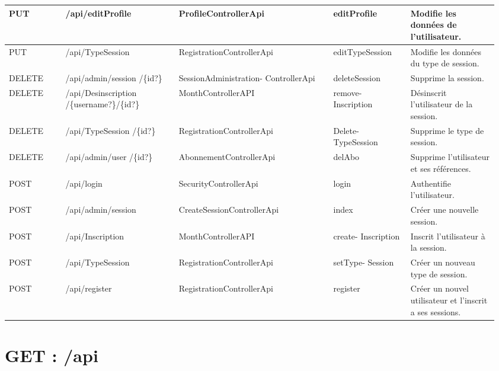 		\newpage
			\begin{center}
				\begin{tabularx}{1.11\textwidth}{| T{0.11\linewidth} | S{0.22\linewidth} | S{0.3\linewidth} | S{0.151\linewidth} | S{0.175\linewidth} |}
					\hline
						PUT & /api/editProfile & ProfileControllerApi & editProfile & Modifie les données de l'utilisateur. \\
					\hline
						PUT & /api/TypeSession & RegistrationControllerApi & editTypeSession & Modifie les données du type de session. \\
					\hline
					
					\hline
					
					\hline
						DELETE & /api/admin/session /\{id?\} & SessionAdministration- ControllerApi & deleteSession & Supprime la session. \\
					\hline
						DELETE & /api/Desinscription /\{username?\}/\{id?\} & MonthControllerAPI & remove- Inscription & Désinscrit l'utilisateur de la session. \\
					\hline
						DELETE & /api/TypeSession /\{id?\} & RegistrationControllerApi & Delete- TypeSession & Supprime le type de session. \\
					\hline
						DELETE & /api/admin/user /\{id?\} & AbonnementControllerApi & delAbo & Supprime l'utilisateur et ses références. \\
					\hline
			
					\hline
					
					\hline
						POST & /api/login & SecurityControllerApi & login & Authentifie l'utilisateur. \\
					\hline
						POST & /api/admin/session & CreateSessionControllerApi & index & Créer une nouvelle session. \\
					\hline
						POST & /api/Inscription & MonthControllerAPI & create- Inscription & Inscrit l'utilisateur à la session. \\
					\hline
						POST & /api/TypeSession & RegistrationControllerApi & setType- Session & Créer un nouveau type de session. \\
					\hline
						POST & /api/register & RegistrationControllerApi & register & Créer un nouvel utilisateur et l'inscrit a ses sessions. \\
					\hline
				\end{tabularx}
			\end{center}


\newpage
\section{GET : /api}
	

